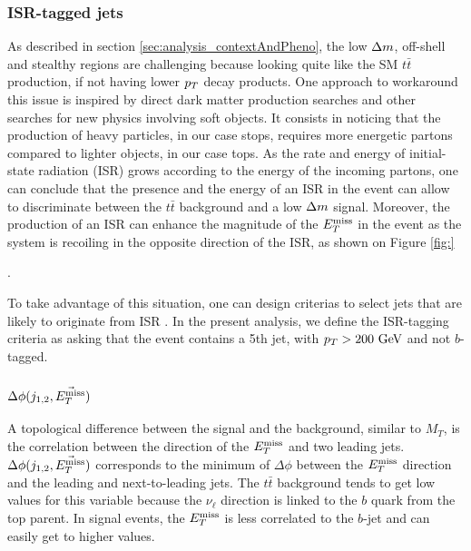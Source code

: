         \subsubsection{ISR-tagged jets}

        As described in section \ref{sec:analysis_contextAndPheno}, the low $\Delta m$,
        off-shell and stealthy regions are challenging because looking quite like the SM
        $t\bar{t}$ production, if not having lower $p_T$ decay products. One approach to
        workaround this issue is inspired by direct dark matter production searches and
        other searches for new physics involving soft objects. It consists in noticing that
        the production of heavy particles, in our case stops, requires more energetic 
        partons compared to lighter objects, in our case tops. As the rate and energy of
        initial-state radiation (ISR) grows according to the energy of the incoming partons, 
        one can conclude that the presence and the energy of an ISR in the event can
        allow to discriminate between the $t\bar{t}$ background and a low $\Delta m$ signal.
        Moreover, the production of an ISR can enhance the magnitude of the $E_T^\text{miss}$ in the
        event as the system is recoiling in the opposite direction of the ISR, as shown on
        Figure \ref{fig:}

        .

        To take advantage of this situation, one can design criterias to select jets that
        are likely to originate from ISR .
        In the present analysis, we define the ISR-tagging criteria as asking that
        the event contains a 5th jet, with $p_T > 200 ~\text{GeV}$ and not $b$-tagged.

        \subsubsection{$\Delta \phi( j_{1,2}, \vec{E_T^\text{miss}} )$ }

        A topological difference between the signal and the background, 
        similar to $M_T$, is the correlation between the direction of the $E_T^\text{miss}$ and two 
        leading jets. $\Delta \phi( j_{1,2}, \vec{E_T^\text{miss}} )$ corresponds to the minimum of 
        $\Delta \phi$ between the $E_T^\text{miss}$ direction and the leading and next-to-leading jets. 
        The $t\bar{t}$ background tends to get low values for this variable because the 
        $\nu_{\ell}$ direction is linked to the $b$ quark from the top parent. In signal 
        events, the $E_T^\text{miss}$ is less correlated to the $b$-jet and can easily get to higher 
        values.

